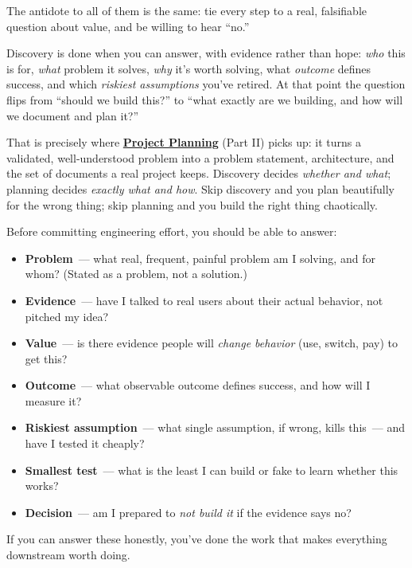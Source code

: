 \noindent{}The antidote to all of them is the same: tie every step to a real, falsifiable question about value,
and be willing to hear ``no.''

\label{product-discovery:the-handoff-to-project-planning}

Discovery is done when you can answer, with evidence rather than hope: \emph{who} this is for, \emph{what}
problem it solves, \emph{why} it's worth solving, what \emph{outcome} defines success, and which \emph{riskiest
assumptions} you've retired. At that point the question flips from ``should we build this?'' to ``what
exactly are we building, and how will we document and plan it?''

That is precisely where \textbf{\hyperref[ch:project-planning-guide]{Project Planning}}
(Part II) picks up: it turns a validated, well-understood problem into a problem statement,
architecture, and the set of documents a real project keeps. Discovery decides \emph{whether and what};
planning decides \emph{exactly what and how}. Skip discovery and you plan beautifully for the wrong
thing; skip planning and you build the right thing chaotically.

\label{product-discovery:a-discovery-checklist}

Before committing engineering effort, you should be able to answer:

\begin{itemize}
\tightlist
\item
  \textbf{Problem}~--- what real, frequent, painful problem am I solving, and for whom? (Stated as a
  problem, not a solution.)
\item
  \textbf{Evidence}~--- have I talked to real users about their actual behavior, not pitched my idea?
\item
  \textbf{Value}~--- is there evidence people will \emph{change behavior} (use, switch, pay) to get this?
\item
  \textbf{Outcome}~--- what observable outcome defines success, and how will I measure it?
\item
  \textbf{Riskiest assumption}~--- what single assumption, if wrong, kills this~--- and have I tested it
  cheaply?
\item
  \textbf{Smallest test}~--- what is the least I can build or fake to learn whether this works?
\item
  \textbf{Decision}~--- am I prepared to \emph{not build it} if the evidence says no?
\end{itemize}

\noindent{}If you can answer these honestly, you've done the work that makes everything downstream worth doing.
